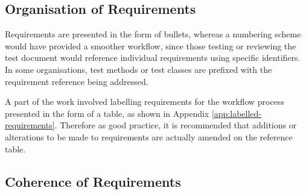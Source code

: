 \subsection{Organisation of Requirements}
Requirements are presented in the form of bullets, whereas a numbering scheme would have provided a smoother workflow, since those testing or reviewing the test document would reference individual requirements using specific identifiers.  In some organisations, test methods or test classes are prefixed with the requirement reference being addressed.
\par
A part of the work involved labelling requirements for the workflow process presented in the form of a table, as shown in Appendix \ref{app:labelled-requirements}.  Therefore as good practice, it is recommended that additions or alterations to be made to requirements are actually amended on the reference table.



\subsection{Coherence of Requirements}


